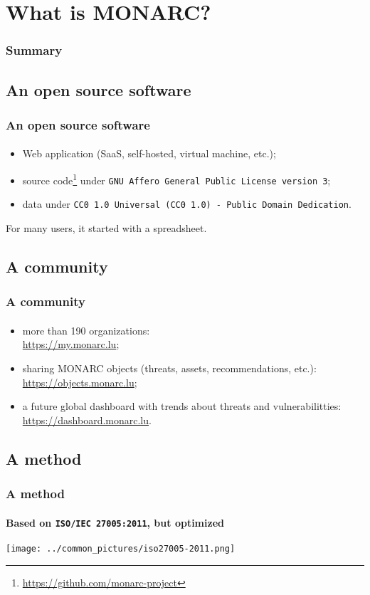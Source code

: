 %
%
\section{What is MONARC?}
\begin{frame}
    \frametitle{Summary}
\end{frame}
\subsection{An open source software}
\begin{frame}
\frametitle{An open source software}
\framesubtitle{}
    \begin{itemize}
        \item Web application (SaaS, self-hosted, virtual machine, etc.);
        \item source code\footnote{\url{https://github.com/monarc-project}} under \texttt{GNU Affero General Public License version 3};
        \item data under \texttt{CC0 1.0 Universal (CC0 1.0) - Public Domain Dedication}.
    \end{itemize}
    \bigskip
    For many users, it started with a spreadsheet.
\end{frame}

\subsection{A community}
\begin{frame}
\frametitle{A community}
\framesubtitle{}
  \begin{itemize}
    \item more than 190 organizations:\\ \url{https://my.monarc.lu};
    \item sharing MONARC objects (threats, assets, recommendations, etc.):\\ \url{https://objects.monarc.lu};
    \item a future global dashboard with trends about threats and vulnerabilitties:\\ \url{https://dashboard.monarc.lu}.
  \end{itemize}
\end{frame}

\subsection{A method}
\begin{frame}
\frametitle{A method}
\framesubtitle{Based on \texttt{ISO/IEC 27005:2011}, but optimized}
    \begin{center}
        \texttt{[image: ../common\_pictures/iso27005-2011.png]}
    \end{center}
\end{frame}
